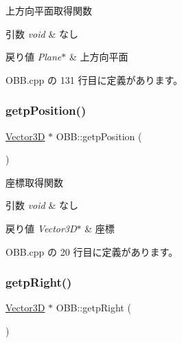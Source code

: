 上方向平面取得関数 


\begin{DoxyParams}{引数}
{\em void} & なし \\
\hline
\end{DoxyParams}

\begin{DoxyRetVals}{戻り値}
{\em Plane$\ast$} & 上方向平面 \\
\hline
\end{DoxyRetVals}


 O\+B\+B.\+cpp の 131 行目に定義があります。

\mbox{\label{class_o_b_b_ae2e378f96e4b3899e133ce50b91155a8}} 
\subsubsection{\texorpdfstring{getp\+Position()}{getpPosition()}}
{\footnotesize\ttfamily \mbox{\hyperlink{class_vector3_d}{Vector3D}} $\ast$ O\+B\+B\+::getp\+Position (\begin{DoxyParamCaption}{ }\end{DoxyParamCaption})}



座標取得関数 


\begin{DoxyParams}{引数}
{\em void} & なし \\
\hline
\end{DoxyParams}

\begin{DoxyRetVals}{戻り値}
{\em Vector3\+D$\ast$} & 座標 \\
\hline
\end{DoxyRetVals}


 O\+B\+B.\+cpp の 20 行目に定義があります。

\mbox{\label{class_o_b_b_a37cef2f1f73bd19c417fead561ec6bf0}} 
\subsubsection{\texorpdfstring{getp\+Right()}{getpRight()}}
{\footnotesize\ttfamily \mbox{\hyperlink{class_vector3_d}{Vector3D}} $\ast$ O\+B\+B\+::getp\+Right (\begin{DoxyParamCaption}{ }\end{DoxyParamCaption})}



